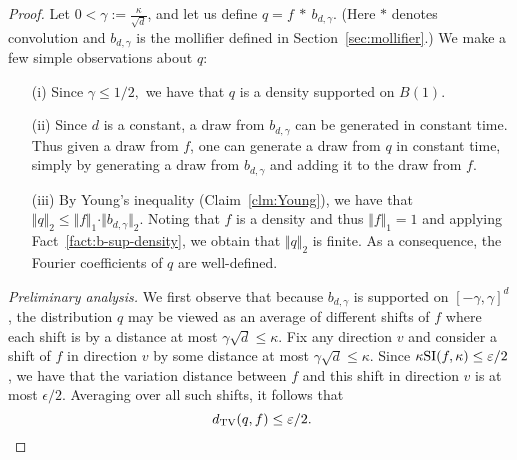 \begin{proof}
Let $0 <  \gamma := \frac{\kappa}{\sqrt{d}}$, 
and let us define $q= f \ \ast  \ b_{d,\gamma}$.  (Here $\ast$ denotes convolution and $b_{d,\gamma}$ is the mollifier defined in Section~\ref{sec:mollifier}.)  We make a few simple observations about $q$:
\begin{itemize}
\item[(i)] Since $\gamma \leq 1/2,$  we have that $q$ is a density supported on $B(1)$. 
\item[(ii)] Since $d$ is a constant, 
a draw from $b_{d,\gamma}$  can be generated in 
constant time.   
Thus given a draw from $f$, 
one can generate a draw from $q$ 
in constant time, simply by generating a draw from $b_{d,\gamma}$ and adding it to the draw from $f$.
\item[(iii)]  By Young's inequality (Claim~\ref{clm:Young}), we have that 
$\Vert q \Vert_2 \le \Vert f \Vert_1 \cdot \Vert b_{d,\gamma} \Vert_2$. Noting that $f$ is a density and thus $\Vert f \Vert_1=1$ and applying Fact~\ref{fact:b-sup-density}, we obtain that $\Vert q \Vert_2$ is finite. As a consequence, the Fourier coefficients of $q$ are well-defined. 
\end{itemize}
\noindent \emph{Preliminary analysis.}
We first observe that because $b_{d,\gamma}$ is supported on $[-\gamma,\gamma]^d$, the distribution $q$ may be viewed as an average of different shifts of $f$ where each shift is by a distance at most $\gamma \sqrt{d} \leq \kappa$. Fix any direction $v$ and consider a shift of $f$ in direction $v$ by some distance at most $\gamma \sqrt{d} \leq \kappa$. Since 
$\kappa {\mathrm{SI}}(f, \kappa) \leq \varepsilon/2$,
we have that the variation distance between $f$ and this shift in direction $v$ is at most $\epsilon/2$.  Averaging over all such shifts, it follows that
\begin{equation}~\label{eq:tv-distance}
d_\mathrm{TV}(q,f) \leq \varepsilon/2.
\end{equation}


\end{proof}
